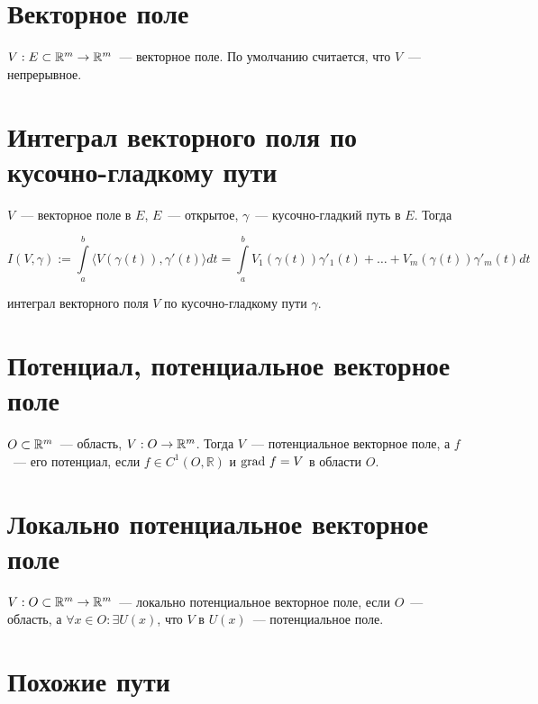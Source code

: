 \documentclass{article}
\begin{document}
    \newpage
    
    \section{Векторное поле}
    
        $V : E \subset \mathbb{R}^m \rightarrow \mathbb{R}^m$~--- векторное поле. По умолчанию считается, что $V$~--- непрерывное.
        
    \newpage
    
    \section{Интеграл векторного поля по кусочно-гладкому пути}
    
        $V$~--- векторное поле в $E$, $E$~--- открытое, $\gamma$~--- кусочно-гладкий путь в $E$. Тогда
        
        $$I(V, \gamma) := \int\limits^b_a \langle V \left( \gamma(t) \right), \gamma' (t) \rangle dt = \int\limits^b_a V_1 \left( \gamma(t) \right) \gamma'_1(t) + \ldots + V_m \left( \gamma(t) \right) \gamma'_m(t) dt$$
        
        интеграл векторного поля $V$ по кусочно-гладкому пути $\gamma$.
        
    \newpage
    
    \section{Потенциал, потенциальное векторное поле}
    
        $O \subset \mathbb{R}^m$~--- область, $V : O \rightarrow \mathbb{R}^m$. Тогда $V$~--- потенциальное векторное поле, а $f$~--- его потенциал, если $f \in C^1 \left( O, \mathbb{R} \right)$ и $\grad f = V$ в области $O$.
        
    \newpage
    
    \section{Локально потенциальное векторное поле}
    
        $V : O \subset \mathbb{R}^m \rightarrow \mathbb{R}^m$~--- локально потенциальное векторное поле, если $O$~--- область, а $\forall x \in O : \exists U(x)$, что $V$ в $U(x)$~--- потенциальное поле.
        
    \newpage
    
    \section{Похожие пути}
    
\end{document}
